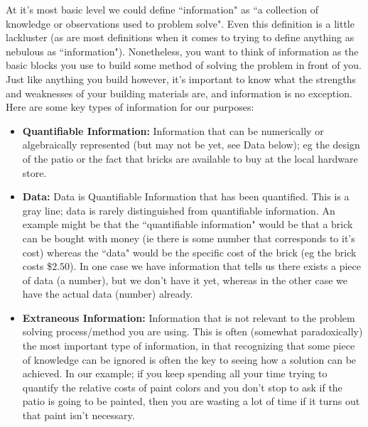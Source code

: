 \documentclass{ximeraXloud}
\begin{document}
At it's most basic level we could define ``information" as ``a collection of knowledge or observations used to problem solve". Even this definition is a little lackluster (as are most definitions when it comes to trying to define anything as nebulous as ``information"). Nonetheless, you want to think of information as the basic blocks you use to build some method of solving the problem in front of you. Just like anything you build however, it's important to know what the strengths and weaknesses of your building materials are, and information is no exception. Here are some key types of information for our purposes:
\begin{itemize}
    \item{\textbf{Quantifiable Information:}} Information that can be numerically or algebraically represented (but may not be yet, see Data below); eg the design of the patio or the fact that bricks are available to buy at the local hardware store.
    \item{\textbf{Data:}} Data is Quantifiable Information that has been quantified. This is a gray line; data is rarely distinguished from quantifiable information. An example might be that the ``quantifiable information" would be that a brick can be bought with money (ie there is some number that corresponds to it's cost) whereas the ``data" would be the specific cost of the brick (eg the brick costs \$$2.50$). In one case we have information that tells us there exists a piece of data (a number), but we don't have it yet, whereas in the other case we have the actual data (number) already.
    \item{\textbf{Extraneous Information:}} Information that is not relevant to the problem solving process/method you are using. This is often (somewhat paradoxically) the most important type of information, in that recognizing that some piece of knowledge can be ignored is often the key to seeing how a solution can be achieved. In our example; if you keep spending all your time trying to quantify the relative costs of paint colors and you don't stop to ask if the patio is going to be painted, then you are wasting a lot of time if it turns out that paint isn't necessary.
\end{itemize}
\end{document}
